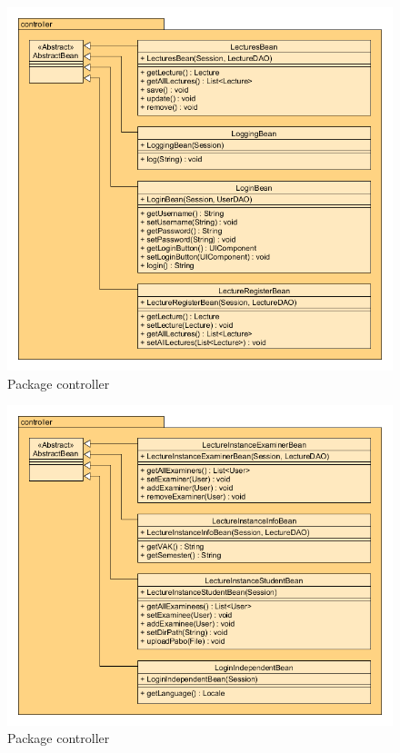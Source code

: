 \begin{figure}[H]
\includegraphics[width=\textwidth]{../UMLDiagramme/controller/gfx/4_package_controller_part_5.png}
	\caption{Package controller}
\end{figure}

\begin{figure}[H]
\includegraphics[width=\textwidth]{../UMLDiagramme/controller/gfx/4_package_controller_part_6.png}
	\caption{Package controller}
\end{figure}

